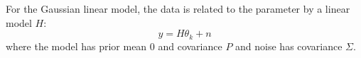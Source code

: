 \documentclass[11pt]{article}
\begin{document}
	
	For the Gaussian linear model, the data is related to the parameter by a linear model $H$:
	\begin{equation}
		y = H\theta_k + n 
	\end{equation}
	where the model has prior mean $0$ and covariance $P$ and noise has covariance $\Sigma$.
	
\end{document}
